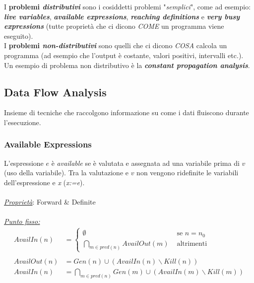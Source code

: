 \documentclass{article}
\begin{document}
            I \textbf{problemi \textit{distributivi}} sono i cosiddetti problemi "\textit{semplici}", come ad esempio: \textit{\textbf{live variables}}, \textit{\textbf{available expressions}}, \textit{\textbf{reaching definitions}} e \textit{\textbf{very busy expressions}} (tutte proprietà che ci dicono \textit{COME} un programma viene eseguito).\\
            I \textbf{problemi \textit{non-distributivi}} sono quelli che ci dicono \textit{COSA} calcola un programma (ad esempio che l'output è costante, valori positivi, intervalli etc.). Un esempio di problema non distributivo è la \textit{\textbf{constant propagation analysis}}.

            \subsection{Data Flow Analysis}
                Insieme di tecniche che raccolgono informazione su come i dati fluiscono durante l'esecuzione.

                \subsubsection{Available Expressions}
                    L'espressione $e$ è \textit{available} se è valutata e assegnata ad una variabile prima di $v$ (uso della variabile). Tra la valutazione e $v$ non vengono ridefinite le variabili dell'espressione e \textit{x} (\textit{x:=e}).\\
                    \\
                    \noindent
                    \textit{\underline{Proprietà}}: Forward \& Definite\\
                    \\
                    \noindent
                    \underline{\textit{Punto fisso:}}
                    \begin{align*}
                        AvailIn(n) &= 
                        \begin{cases}
                            \emptyset &\text{ se } n = n_0 \\
                            \bigcap_{m\in pred(n)} AvailOut(m) &\text{ altrimenti}
                        \end{cases}\\ \\
                        AvailOut(n) &= Gen(n) \cup (AvailIn(n)\backslash Kill(n))\\
                        AvailIn(n) &= \bigcap_{m\in pred(n)} Gen(m) \cup (AvailIn(m)\backslash Kill(m))
                    \end{align*}
\end{document}
